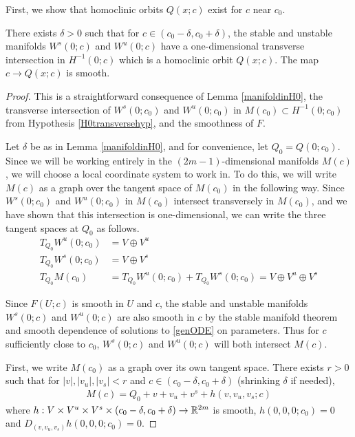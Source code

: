 \documentclass[thesis.tex]{subfiles}
\begin{document}
First, we show that homoclinic orbits $Q(x; c)$ exist for $c$ near $c_0$.

\begin{lemma}\label{Qcexistslemma}
There exists $\delta > 0$ such that for $c \in (c_0 - \delta, c_0 + \delta)$, the stable and unstable manifolds $W^s(0; c)$ and $W^u(0; c)$ have a one-dimensional transverse intersection in $H^{-1}(0; c)$ which is a homoclinic orbit $Q(x; c)$. The map $c \rightarrow Q(x; c)$ is smooth.

\begin{proof}
This is a straightforward consequence of Lemma \ref{manifoldinH0}, the transverse intersection of $W^s(0; c_0)$ and $W^u(0; c_0)$ in $M(c_0) \subset H^{-1}(0; c_0)$ from Hypothesis \ref{H0transversehyp}, and the smoothness of $F$.

Let $\delta$ be as in Lemma \ref{manifoldinH0}, and for convenience, let $Q_0 = Q(0; c_0)$. Since we will be working entirely in the $(2m-1)$-dimensional manifolds $M(c)$, we will choose a local coordinate system to work in. To do this, we will write $M(c)$ as a graph over the tangent space of $M(c_0)$ in the following way. Since $W^s(0; c_0)$ and $W^u(0; c_0)$ in $M(c_0)$ intersect transversely in $M(c_0)$, and we have shown that this intersection is one-dimensional, we can write the three tangent spaces at $Q_0$ as follows.
\begin{align*}
T_{Q_0}W^u(0; c_0) &= V \oplus V^u \\
T_{Q_0}W^s(0; c_0) &= V \oplus V^s \\
T_{Q_0}M(c_0) &= T_{Q_0}W^u(0; c_0) 
+ T_{Q_0}W^s(0; c_0) = V \oplus V^u \oplus V^s
\end{align*}

Since $F(U; c)$ is smooth in $U$ and $c$, the stable and unstable manifolds $W^s(0; c)$ and $W^u(0; c)$ are also smooth in $c$ by the stable manifold theorem and smooth dependence of solutions to \eqref{genODE} on parameters. Thus for $c$ sufficiently close to $c_0$, $W^s(0; c)$ and $W^u(0; c)$ will both intersect $M(c)$. 

First, we write $M(c_0)$ as a graph over its own tangent space. There exists $r > 0$ such that for $|v|, |v_u|, |v_s| < r$ and $c \in (c_0 - \delta, c_0 + \delta)$ (shrinking $\delta$ if needed), 
\begin{align*}
M(c) = Q_0 + v + v_u + v^s + h(v, v_u, v_s; c)
\end{align*}
where $h: V \times V^u \times V^s \times (c_0 - \delta, c_0 + \delta) \rightarrow \mathbb{R}^{2m}$ is smooth, $h(0,0,0; c_0) = 0$ and $D_{(v, v_u, v_s)} h(0, 0, 0; c_0) = 0$.


\end{proof}
\end{lemma}
\end{document}
